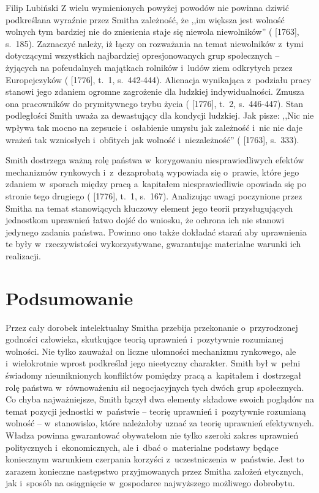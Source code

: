 \begin{artplenv}{Filip Lubiński}
Z wielu wymienionych powyżej powodów nie powinna dziwić podkreślana wyraźnie przez Smitha zależność, że ,,im większa
jest wolność wolnych tym bardziej nie do zniesienia staje się niewola niewolników''
(\cite{smith_lectures_1982} [1763], s.~185).
Zaznaczyć należy, iż łączy on rozważania na temat niewolników z~tymi dotyczącymi wszystkich
najbardziej opresjonowanych grup społecznych -- żyjących na pofeudalnych majątkach rolników i~ludów ziem odkrytych przez
Europejczyków
(\cite{smith_badania_2007} [1776], t.~1, s.~442-444).
Alienacja wynikająca z~podziału pracy
stanowi jego zdaniem ogromne zagrożenie dla ludzkiej indywidualności. Zmusza ona pracowników do prymitywnego trybu
życia
(\cite{smith_badania_2007} [1776], t.~2, s.~446-447).
Stan podległości Smith uważa za dewastujący dla
kondycji ludzkiej. Jak pisze: ,,Nic nie wpływa tak mocno na zepsucie i~osłabienie umysłu jak zależność i~nic nie daje
wrażeń tak wzniosłych i~obfitych jak wolność i~niezależność''
(\cite{smith_lectures_1982} [1763], s.~333).

Smith dostrzega ważną rolę państwa w~korygowaniu niesprawiedliwych efektów mechanizmów rynkowych i~z~dezaprobatą
wypowiada się o~prawie, które jego zdaniem w~sporach między pracą a~kapitałem niesprawiedliwie opowiada się po stronie
tego drugiego
(\cite{smith_badania_2007} [1776], t.~1, s.~167).
Analizując uwagi poczynione przez Smitha na
temat stanowiących kluczowy element jego teorii przysługujących jednostkom uprawnień łatwo dojść do wniosku, że ochrona
ich nie stanowi jedynego zadania państwa. Powinno ono także dokładać starań aby uprawnienia te były w~rzeczywistości
wykorzystywane, gwarantując materialne warunki ich realizacji.

\section*{Podsumowanie}
Przez cały dorobek intelektualny Smitha przebija przekonanie o~przyrodzonej godności człowieka, skutkujące teorią
uprawnień i~pozytywnie rozumianej wolności. Nie tylko zauważał on liczne ułomności mechanizmu rynkowego,
ale i~wielokrotnie wprost podkreślał jego nieetyczny charakter. Smith był w~pełni świadomy nieuniknionych konfliktów pomiędzy
pracą a~kapitałem i~dostrzegał rolę państwa w~równoważeniu sił negocjacyjnych tych dwóch grup społecznych. Co chyba
najważniejsze, Smith łączył dwa elementy składowe swoich poglądów na temat pozycji jednostki w~państwie -- teorię
uprawnień i~pozytywnie rozumianą wolność -- w~stanowisko, które należałoby uznać za teorię uprawnień efektywnych. Władza
powinna gwarantować obywatelom nie tylko szeroki zakres uprawnień politycznych i~ekonomicznych, ale i~dbać o~materialne
podstawy będące koniecznym warunkiem czerpania korzyści z~uczestniczenia w~państwie. Jest to zarazem konieczne
następstwo przyjmowanych przez Smitha założeń etycznych, jak i~sposób na osiągnięcie w~gospodarce najwyższego możliwego
dobrobytu.


\end{artplenv}
